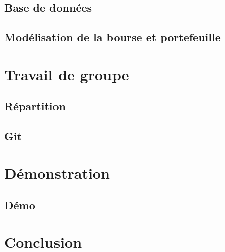\documentclass{beamer}
\begin{document}
	    \subsection{Base de données}
	        
	        
	    \subsection{Modélisation de la bourse et portefeuille}
	        
	        
    
    \section{Travail de groupe}
        \subsection{Répartition} 
	        
	        
	    \subsection{Git} %
	        
	            
	
	  \section{Démonstration}
        \subsection{Démo}
	        	        
	        
        	
    \section{Conclusion}
        \subsection{}
            
\end{document}
